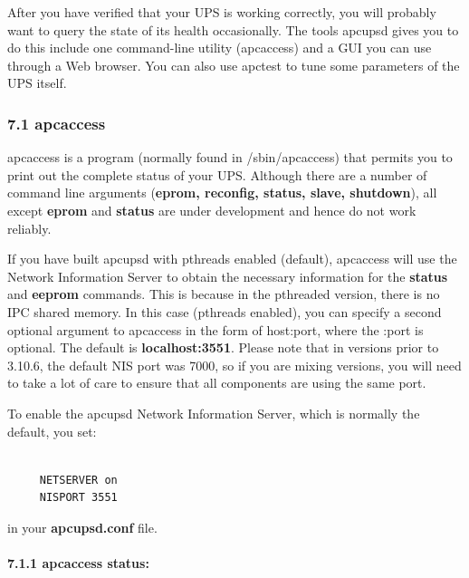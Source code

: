 \label{index-Monitoring-109}
\label{index-Tuning-110}
After you have verified that your UPS is working correctly, you will probably
want to query the state of its health occasionally. The tools apcupsd gives
you to do this include one command-line utility (apcaccess) and a GUI you can
use through a Web browser.  You can also use apctest to tune some parameters
of the UPS itself. 

\label{apcaccess}

\subsubsection*{7.1 apcaccess}

\label{index-apcaccess-111}
apcaccess is a program (normally found in /sbin/apcaccess) that permits you to
print out the complete status of your UPS. Although there are a number of
command line arguments ({\bf eprom, reconfig, status, slave, shutdown}), all
except {\bf eprom} and {\bf status} are under development and hence do not
work reliably.  

If you have built apcupsd with pthreads enabled (default), apcaccess will use
the Network Information Server to obtain the necessary information for the
{\bf status} and {\bf eeprom} commands. This is because in the pthreaded
version, there is no IPC shared memory. In this case (pthreads enabled), you
can specify a second optional argument to apcaccess in the form of host:port,
where the :port is optional. The default is {\bf localhost:3551}. Please note
that in versions prior to 3.10.6, the default NIS port was 7000, so if you are
mixing versions, you will need to take a lot of care to ensure that all
components are using the same port.  

To enable the apcupsd Network Information Server, which is normally the
default, you set: 

\footnotesize
\begin{verbatim}
     
     NETSERVER on
     NISPORT 3551
\end{verbatim}
\normalsize

in your {\bf apcupsd.conf} file. 

\label{apcaccess-status}

\paragraph*{7.1.1 apcaccess status:}

